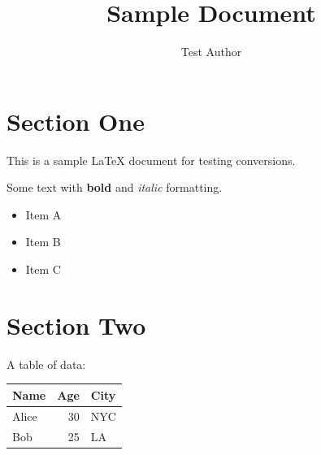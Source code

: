\documentclass{article}
\title{Sample Document}
\author{Test Author}
\begin{document}
\maketitle

\section{Section One}
This is a sample \LaTeX{} document for testing conversions.

Some text with \textbf{bold} and \textit{italic} formatting.

\begin{itemize}
\item Item A
\item Item B
\item Item C
\end{itemize}

\section{Section Two}
A table of data:

\begin{tabular}{lrl}
\hline
Name & Age & City \\
\hline
Alice & 30 & NYC \\
Bob & 25 & LA \\
\hline
\end{tabular}
\end{document}
